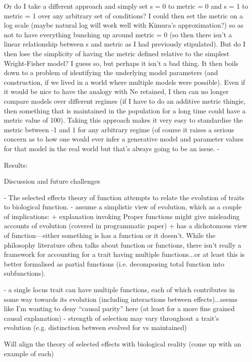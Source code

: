 \documentclass{article}
\begin{document}
Or do I take a different approach and simply set s = 0 to metric = 0 and s = 1 to metric = 1 over any arbitrary set of conditions? I could then set the metric on a log scale (maybe natural log will work well with Kimura's approximation?) so as not to have everything bunching up around metric = 0 (so then there isn't a linear relationship between s and metric as I had previously stipulated). But do I then lose the simplicity of having the metric defined relative to the simplest Wright-Fisher model? I guess so, but perhaps it isn't a bad thing. It then boils down to a problem of identifying the underlying model parameters (and construction, if we lived in a world where multiple models were possible).
Even if it would be nice to have the analogy with Ne retained, I then can no longer compare models over different regimes (if I have to do an additive metric thingie, then something that is maintained in the population for a long time could have a metric value of 100). Taking this approach makes it very easy to standardise the metric between -1 and 1 for any arbitrary regime (of course it raises a serious concern as to how one would ever infer a generative model and parameter values for that model in the real world but that's always going to be an issue.
- 

Results: 

Discussion and future challenges

- The selected effects theory of function attempts to relate the evolution of traits to biological function.
- assume a simplistic view of evolution, which as a couple of implications:
  + explanation invoking Proper functions might give misleading accounts of evolution (covered in programmatic paper)
  + has a dichotomous view of function---either something is has a function or it doesn't. While the philosophy literature often talks about function or functions, there isn't really a framework for accounting for a trait having multiple functions...or at least this is better formalised as partial functions (i.e. decomposing total function into subfunctions).

  - a single locus trait can have multiple functions, each of which contributes in some way towards its evolution (including interactions between effects)...seems like I'm wanting to deny ``causal parity'' here (at least for a more fine grained causal explanation)
  - strength of selection may vary throughout a trait's evolution (e.g. distinction between evolved for vs maintained)


  Will align the theory of selected effects with biological reality (come up with an example of each)
\end{document}
